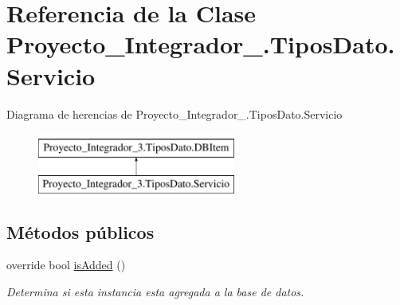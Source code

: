 \hypertarget{class_proyecto___integrador__3_1_1_tipos_dato_1_1_servicio}{\section{Referencia de la Clase Proyecto\-\_\-\-Integrador\-\_.\-Tipos\-Dato.\-Servicio}
\label{class_proyecto___integrador__3_1_1_tipos_dato_1_1_servicio}
}
Diagrama de herencias de Proyecto\-\_\-\-Integrador\-\_.\-Tipos\-Dato.\-Servicio\begin{figure}[H]
\begin{center}
\leavevmode
\includegraphics[height=2.000000cm]{da/de4/class_proyecto___integrador__3_1_1_tipos_dato_1_1_servicio}
\end{center}
\end{figure}
\subsection*{Métodos públicos}
\begin{DoxyCompactItemize}
\item 
override bool \hyperlink{class_proyecto___integrador__3_1_1_tipos_dato_1_1_servicio_a84ccd70aa17d65df0afff55a14faeeec}{is\-Added} ()
\begin{DoxyCompactList}\small\item\em Determina si esta instancia esta agregada a la base de datos. \end{DoxyCompactList}\end{DoxyCompactItemize}
